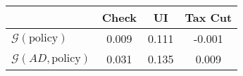\begin{tabular}{@{}lccc@{}} 
\toprule 
                          & Check      & UI    & Tax Cut    \\  \midrule 
$\mathcal{G}(\text{policy})$ & 0.009  & 0.111  & -0.001     \\ 
$\mathcal{G}(AD,\text{policy})$ & 0.031  & 0.135  & 0.009     \\ 
\end{tabular}  
